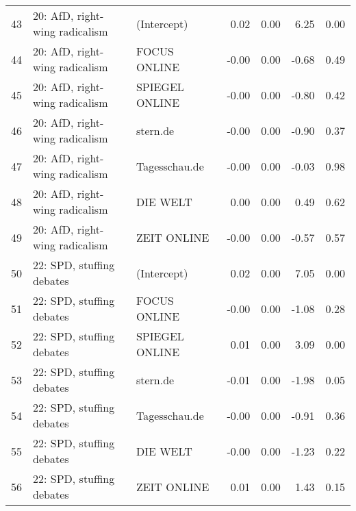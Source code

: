 \begin{table}[ht]
{\begin{tabular}{rllrrrr}
  43 & 20: AfD, right-wing radicalism & (Intercept) & 0.02 & 0.00 & 6.25 & 0.00 \\ 
  44 & 20: AfD, right-wing radicalism & FOCUS ONLINE & -0.00 & 0.00 & -0.68 & 0.49 \\ 
  45 & 20: AfD, right-wing radicalism & SPIEGEL ONLINE & -0.00 & 0.00 & -0.80 & 0.42 \\ 
  46 & 20: AfD, right-wing radicalism & stern.de & -0.00 & 0.00 & -0.90 & 0.37 \\ 
  47 & 20: AfD, right-wing radicalism & Tagesschau.de & -0.00 & 0.00 & -0.03 & 0.98 \\ 
  48 & 20: AfD, right-wing radicalism & DIE WELT & 0.00 & 0.00 & 0.49 & 0.62 \\ 
  49 & 20: AfD, right-wing radicalism & ZEIT ONLINE & -0.00 & 0.00 & -0.57 & 0.57 \\ 
  50 & 22: SPD, stuffing debates & (Intercept) & 0.02 & 0.00 & 7.05 & 0.00 \\ 
  51 & 22: SPD, stuffing debates & FOCUS ONLINE & -0.00 & 0.00 & -1.08 & 0.28 \\ 
  52 & 22: SPD, stuffing debates & SPIEGEL ONLINE & 0.01 & 0.00 & 3.09 & 0.00 \\ 
  53 & 22: SPD, stuffing debates & stern.de & -0.01 & 0.00 & -1.98 & 0.05 \\ 
  54 & 22: SPD, stuffing debates & Tagesschau.de & -0.00 & 0.00 & -0.91 & 0.36 \\ 
  55 & 22: SPD, stuffing debates & DIE WELT & -0.00 & 0.00 & -1.23 & 0.22 \\ 
  56 & 22: SPD, stuffing debates & ZEIT ONLINE & 0.01 & 0.00 & 1.43 & 0.15 \\ 
   \hline
\end{tabular}
}
\end{table}
